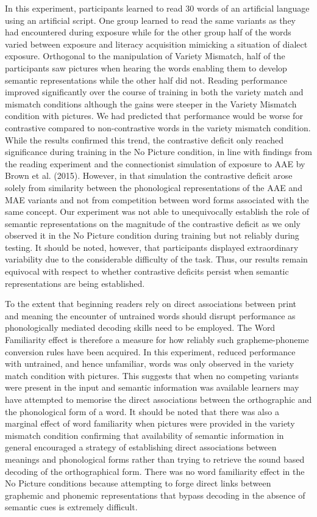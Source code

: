 \documentclass[doc,floatsintext]{apa6}
\begin{document}
In this experiment, participants learned to read 30 words of an
artificial language using an artificial script. One group learned to
read the same variants as they had encountered during exposure while for
the other group half of the words varied between exposure and literacy
acquisition mimicking a situation of dialect exposure. Orthogonal to the
manipulation of Variety Mismatch, half of the participants saw pictures
when hearing the words enabling them to develop semantic representations
while the other half did not. Reading performance improved significantly
over the course of training in both the variety match and mismatch
conditions although the gains were steeper in the Variety Mismatch
condition with pictures. We had predicted that performance would be
worse for contrastive compared to non-contrastive words in the variety
mismatch condition. While the results confirmed this trend, the
contrastive deficit only reached significance during training in the No
Picture condition, in line with findings from the reading experiment and
the connectionist simulation of exposure to AAE by Brown et al. (2015).
However, in that simulation the contrastive deficit arose solely from
similarity between the phonological representations of the AAE and MAE
variants and not from competition between word forms associated with the
same concept. Our experiment was not able to unequivocally establish the
role of semantic representations on the magnitude of the contrastive
deficit as we only observed it in the No Picture condition during
training but not reliably during testing. It should be noted, however,
that participants displayed extraordinary variability due to the
considerable difficulty of the task. Thus, our results remain equivocal
with respect to whether contrastive deficits persist when semantic
representations are being established.

To the extent that beginning readers rely on direct associations between
print and meaning the encounter of untrained words should disrupt
performance as phonologically mediated decoding skills need to be
employed. The Word Familiarity effect is therefore a measure for how
reliably such grapheme-phoneme conversion rules have been acquired. In
this experiment, reduced performance with untrained, and hence
unfamiliar, words was only observed in the variety match condition with
pictures. This suggests that when no competing variants were present in
the input and semantic information was available learners may have
attempted to memorise the direct associations between the orthographic
and the phonological form of a word. It should be noted that there was
also a marginal effect of word familiarity when pictures were provided
in the variety mismatch condition confirming that availability of
semantic information in general encouraged a strategy of establishing
direct associations between meanings and phonological forms rather than
trying to retrieve the sound based decoding of the orthographical form.
There was no word familiarity effect in the No Picture conditions
because attempting to forge direct links between graphemic and phonemic
representations that bypass decoding in the absence of semantic cues is
extremely difficult.
\end{document}
